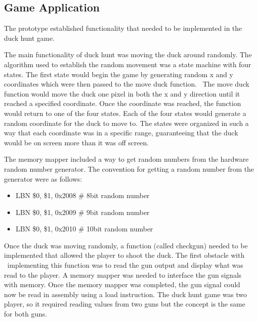 \documentclass[letterpaper, 11 pt, conference]{article}
\begin{document}
\subsection{Game Application}

The prototype established functionality that needed to be implemented in the duck hunt game. 

The main functionality of duck hunt was moving the duck around randomly. The algorithm used to establish the random movement was a state machine with four states. The first state would begin the game by generating random x and y coordinates which were then passed to the move duck function.  The move duck function would move the duck one pixel in both the x and y direction until it reached a specified coordinate. Once the coordinate was reached, the function would return to one of the four states. Each of the four states would generate a random coordinate for the duck to move to. The states were organized in such a way that each coordinate was in a specific range, guaranteeing that the duck would be on screen more than it was off screen. 

The memory mapper included a way to get random numbers from the hardware random number generator. The convention for getting a random number from the generator were as follows:

\begin{itemize}
    \item LBN \$0, \$1, 0x2008 \# 8bit random number
    \item LBN \$0, \$1, 0x2009 \# 9bit random number
    \item LBN \$0, \$1, 0x2010 \# 10bit random number
\end{itemize}


Once the duck was moving randomly, a function (called checkgun) needed to be implemented that allowed the player to shoot the duck. The first obstacle with  implementing this function was to read the gun output and display what was read to the player. A memory mapper was needed to interface the gun signals with memory. Once the memory mapper was completed, the gun signal could now be read in assembly using a load instruction. The duck hunt game was two player, so it required reading values from two guns but the concept is the same for both guns.
\end{document}
